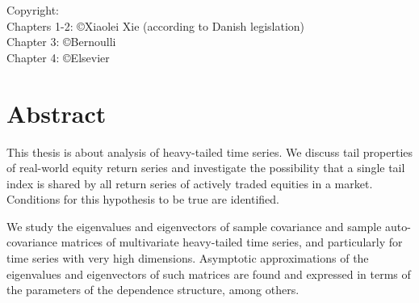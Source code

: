 \vspace*{5cm}
\noindent \hspace*{0.5cm} Copyright:\\
\hspace*{0.5cm} Chapters 1-2: \copyright Xiaolei Xie (according to Danish legislation)\\
\hspace*{0.5cm} Chapter 3: \copyright Bernoulli\\
\hspace*{0.5cm} Chapter 4: \copyright Elsevier

	
	
		
		
	

\section*{Abstract}

This thesis is about analysis of heavy-tailed time series. We discuss tail
properties of real-world equity return series and investigate the
possibility that a single tail index is shared by all return series of
actively traded equities in a market. Conditions for this hypothesis to
be true are identified.

We study the eigenvalues and eigenvectors of sample covariance and
sample auto-covariance matrices of multivariate heavy-tailed time series,
and particularly for time series with very high dimensions. Asymptotic
approximations of the eigenvalues and eigenvectors of such matrices
are found and expressed in terms of the parameters of the dependence
structure, among others.

